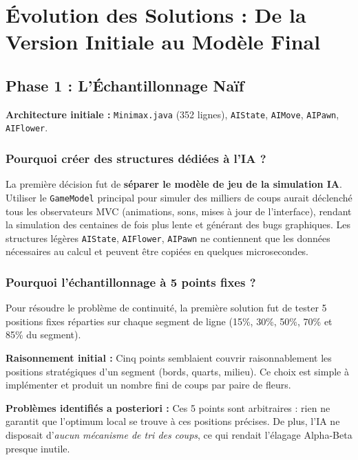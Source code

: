 \documentclass[12pt, a4paper]{article}
\begin{document}
\section{\'Evolution des Solutions : De la Version Initiale au Mod\`ele Final}

\subsection{Phase 1 : L'\'Echantillonnage Na\"if}

\textbf{Architecture initiale :} \texttt{Minimax.java} (352 lignes), \texttt{AIState}, \texttt{AIMove}, \texttt{AIPawn}, \texttt{AIFlower}.

\subsubsection{Pourquoi cr\'eer des structures d\'edi\'ees \`a l'IA ?}
La premi\`ere d\'ecision fut de \textbf{s\'eparer le mod\`ele de jeu de la simulation IA}. Utiliser le \texttt{GameModel} principal pour simuler des milliers de coups aurait d\'eclench\'e tous les observateurs MVC (animations, sons, mises \`a jour de l'interface), rendant la simulation des centaines de fois plus lente et g\'en\'erant des bugs graphiques. Les structures l\'eg\`eres \texttt{AIState}, \texttt{AIFlower}, \texttt{AIPawn} ne contiennent que les donn\'ees n\'ecessaires au calcul et peuvent \^etre copi\'ees en quelques microsecondes.

\subsubsection{Pourquoi l'\'echantillonnage \`a 5 points fixes ?}
Pour r\'esoudre le probl\`eme de continuit\'e, la premi\`ere solution fut de tester 5 positions fixes r\'eparties sur chaque segment de ligne (15\%, 30\%, 50\%, 70\% et 85\% du segment).

\textbf{Raisonnement initial :} Cinq points semblaient couvrir raisonnablement les positions strat\'egiques d'un segment (bords, quarts, milieu). Ce choix est simple \`a impl\'ementer et produit un nombre fini de coups par paire de fleurs.

\textbf{Probl\`emes identifi\'es a posteriori :} Ces 5 points sont arbitraires : rien ne garantit que l'optimum local se trouve \`a ces positions pr\'ecises. De plus, l'IA ne disposait d'\textit{aucun m\'ecanisme de tri des coups}, ce qui rendait l'\'elagage Alpha-Beta presque inutile.
\end{document}
